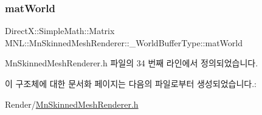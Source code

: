 \subsubsection{\texorpdfstring{mat\+World}{matWorld}}
{\footnotesize\ttfamily Direct\+X\+::\+Simple\+Math\+::\+Matrix M\+N\+L\+::\+Mn\+Skinned\+Mesh\+Renderer\+::\+\_\+\+World\+Buffer\+Type\+::mat\+World}



Mn\+Skinned\+Mesh\+Renderer.\+h 파일의 34 번째 라인에서 정의되었습니다.



이 구조체에 대한 문서화 페이지는 다음의 파일로부터 생성되었습니다.\+:\begin{DoxyCompactItemize}
\item 
Render/\hyperlink{_mn_skinned_mesh_renderer_8h}{Mn\+Skinned\+Mesh\+Renderer.\+h}\end{DoxyCompactItemize}

